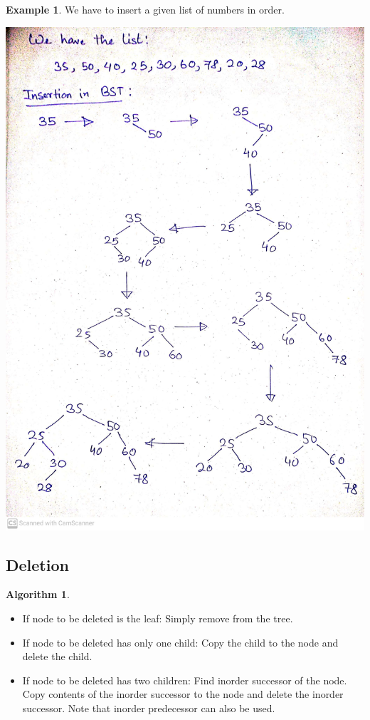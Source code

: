 \documentclass[10pt, a4paper]{extarticle}
\theoremstyle{definition}
\newtheorem{alg}{Algorithm}
\newtheorem{eg}{Example}
\begin{document}
\begin{eg}
	We have to insert a given list of numbers in order.
	\begin{center}
		\includegraphics[scale=0.1]{bst4.jpg}\\
	\end{center}
\end{eg}
\subsection{Deletion}
\begin{alg}\hfill
	\begin{itemize}
		\item If node to be deleted is the leaf: Simply remove from the tree.
		\item If node to be deleted has only one child: Copy the child to the node and delete the child.
		\item If node to be deleted has two children: Find inorder successor of the node. Copy contents of the inorder successor to the node and delete the inorder successor. Note that inorder predecessor can also be used.
	\end{itemize}
\end{alg}
\end{document}
